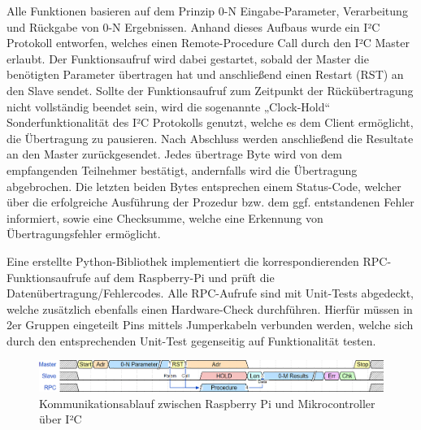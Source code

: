  Alle Funktionen basieren auf dem Prinzip 0-N Eingabe-Parameter, Verarbeitung und Rückgabe von 0-N Ergebnissen. Anhand dieses Aufbaus wurde ein I²C Protokoll entworfen, welches einen Remote-Procedure Call durch den I²C Master erlaubt. Der Funktionsaufruf wird dabei gestartet, sobald der Master die benötigten Parameter übertragen hat und anschließend einen Restart (RST) an den Slave sendet. Sollte der Funktionsaufruf zum Zeitpunkt der Rückübertragung nicht vollständig beendet sein, wird die sogenannte „Clock-Hold“ Sonderfunktionalität des I²C Protokolls genutzt, welche es dem Client ermöglicht, die Übertragung zu pausieren. Nach Abschluss werden anschließend die Resultate an den Master zurückgesendet. Jedes übertrage Byte wird von dem empfangenden Teilnehmer bestätigt, andernfalls wird die Übertragung abgebrochen. Die letzten beiden Bytes entsprechen einem Status-Code, welcher über die erfolgreiche Ausführung der Prozedur bzw. dem ggf. entstandenen Fehler informiert, sowie eine Checksumme, welche eine Erkennung von Übertragungsfehler ermöglicht.

 Eine erstellte Python-Bibliothek implementiert die korrespondierenden RPC-Funktionsaufrufe auf dem Raspberry-Pi und prüft die Datenübertragung/Fehlercodes. Alle RPC-Aufrufe sind mit Unit-Tests abgedeckt, welche zusätzlich ebenfalls einen Hardware-Check durchführen. Hierfür müssen in 2er Gruppen eingeteilt Pins mittels Jumperkabeln verbunden werden, welche sich durch den entsprechenden Unit-Test gegenseitig auf Funktionalität testen. 

 \begin{figure}[h!]
      \centering
      \includegraphics[scale=0.55]{abbildungen/kommunikationsProtokoll.png}
      \caption{Kommunikationsablauf zwischen Raspberry Pi und Mikrocontroller über I²C}
 \end{figure}
